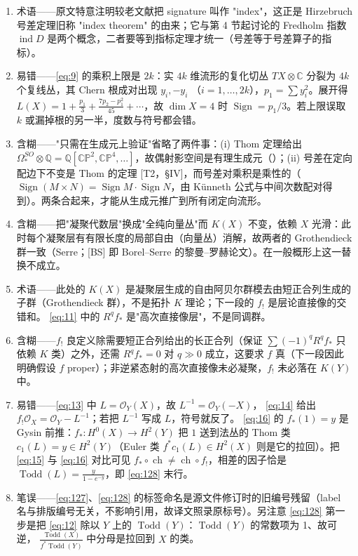 \documentclass[11pt]{amsart}
\theoremstyle{definition}
\theoremstyle{remark}
\theoremstyle{plain}
\numberwithin{equation}{section}
\renewcommand{\:}{\colon}
\newcommand{\CC}{{\mathbb C}}
\newcommand{\CP}{{\mathbb C\mathbb P}}
\newcommand{\QQ}{{\mathbb Q}}
\DeclareMathOperator{\ch}{ch}
\DeclareMathOperator{\ind}{ind}
\newcommand{\inv}{^{-1}}
\DeclareMathOperator{\Sign}{Sign}
\DeclareMathOperator{\Todd}{Todd}
\newcommand{\sO}{\mathcal{O}}
\begin{document}
\begin{enumerate}[leftmargin=2.2em,itemsep=2pt,topsep=2pt]
  \item 术语——原文特意注明较老文献把 signature 叫作 "index"，这正是 Hirzebruch 号差定理旧称 "index theorem" 的由来；它与第 4 节起讨论的 Fredholm 指数 $\ind D$ 是两个概念，二者要等到指标定理才统一（号差等于号差算子的指标）。
  \item 易错——\eqref{eq:9} 的乘积上限是 $2k$：实 $4k$ 维流形的复化切丛 $TX\otimes\CC$ 分裂为 $4k$ 个复线丛，其 Chern 根成对出现 $y_i,-y_i$ （$i=1,\dots,2k$），$p_1=\sum y_i^2$。展开得 $L(X)=1+\frac{p_1}{3} +\frac{7p_2-p_1^2}{45}+\cdots$，故 $\dim X=4$ 时 $\Sign=p_1/3$。若上限误取 $k$ 或漏掉根的另一半，度数与符号都会错。
  \item 含糊——"只需在生成元上验证"省略了两件事：(i) Thom 定理给出 $\Omega_*^{SO}\otimes\QQ=\QQ[\CP^2,\CP^4,\dots]$，故偶射影空间是有理生成元（\cite{T1}）；(ii) 号差在定向配边下不变是 Thom 的定理 [T2，\S IV]，而号差对乘积是乘性的（$\Sign(M\times N)=\Sign M\cdot\Sign N$，由 Künneth 公式与中间次数配对得到）。两条合起来，才能从生成元推广到所有闭定向流形。
  \item 含糊——把"凝聚代数层"换成"全纯向量丛"而 $K(X)$ 不变，依赖 $X$ 光滑：此时每个凝聚层有有限长度的局部自由（向量丛）消解，故两者的 Grothendieck 群一致（Serre；[BS] 即 Borel–Serre 的黎曼–罗赫论文）。在一般概形上这一替换不成立。
  \item 术语——此处的 $K(X)$ 是凝聚层生成的自由阿贝尔群模去由短正合列生成的子群（Grothendieck 群），不是拓扑 $K$ 理论；下一段的 $f_!$ 是层论直接像的交错和。 \eqref{eq:11} 中的 $R^qf_*$ 是"高次直接像层"，不是同调群。
  \item 含糊——$f_!$ 良定义除需要短正合列给出的长正合列（保证 $\sum(-1)^qR^qf_*$ 只依赖 $K$ 类）之外，还需 $R^qf_*=0$ 对 $q\gg0$ 成立，这要求 $f$ 真（下一段因此明确假设 $f$ proper）；非逆紧态射的高次直接像未必凝聚，$f_!$ 未必落在 $K(Y)$ 中。
  \item 易错——\eqref{eq:13} 中 $L=\sO_Y(X)$，故 $L\inv=\sO_Y(-X)$， \eqref{eq:14} 给出 $f_!\sO_X=\sO_Y-L\inv$；若把 $L\inv$ 写成 $L$，符号就反了。 \eqref{eq:16} 的 $f_*(1)=y$ 是 Gysin 前推：$f_*:H^0(X)\to H^2(Y)$ 把 $1$ 送到法丛的 Thom 类 $c_1(L)=y\in H^2(Y)$（Euler 类 $f^*c_1(L)\in H^2(X)$ 则是它的拉回）。把 \eqref{eq:15} 与 \eqref{eq:16} 对比可见 $f_*\circ\ch\ne\ch\circ f_!$，相差的因子恰是 $\Todd(L)=\frac{y}{1-e^{-y}}$，即 \eqref{eq:128} 末行。
  \item 笔误——\eqref{eq:127}、\eqref{eq:128} 的标签命名是源文件修订时的旧编号残留（label 名与排版编号无关，不影响引用，故译文照录原标号）。另注意 \eqref{eq:128} 第一步是把 \eqref{eq:12} 除以 $Y$ 上的 $\Todd(Y)$：$\Todd(Y)$ 的常数项为 1、故可逆， $\frac{\Todd(X)}{f^*\Todd(Y)}$ 中分母是拉回到 $X$ 的类。

\end{enumerate}
\end{document}
